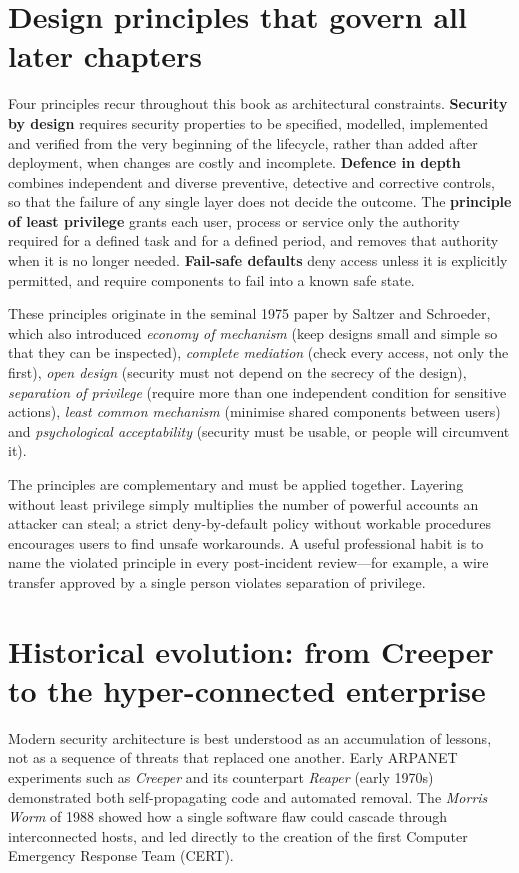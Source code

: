 \section{Design principles that govern all later chapters}\label{sec:1.3}
Four principles recur throughout this book as architectural constraints. \textbf{Security by design} requires security properties to be specified, modelled, implemented and verified from the very beginning of the lifecycle, rather than added after deployment, when changes are costly and incomplete. \textbf{Defence in depth} combines independent and diverse preventive, detective and corrective controls, so that the failure of any single layer does not decide the outcome. The \textbf{principle of least privilege} grants each user, process or service only the authority required for a defined task and for a defined period, and removes that authority when it is no longer needed. \textbf{Fail-safe defaults} deny access unless it is explicitly permitted, and require components to fail into a known safe state.

These principles originate in the seminal 1975 paper by Saltzer and Schroeder, which also introduced \emph{economy of mechanism} (keep designs small and simple so that they can be inspected), \emph{complete mediation} (check every access, not only the first), \emph{open design} (security must not depend on the secrecy of the design), \emph{separation of privilege} (require more than one independent condition for sensitive actions), \emph{least common mechanism} (minimise shared components between users) and \emph{psychological acceptability} (security must be usable, or people will circumvent it).

The principles are complementary and must be applied together. Layering without least privilege simply multiplies the number of powerful accounts an attacker can steal; a strict deny-by-default policy without workable procedures encourages users to find unsafe workarounds. A useful professional habit is to name the violated principle in every post-incident review—for example, a wire transfer approved by a single person violates separation of privilege.

\section{Historical evolution: from Creeper to the hyper-connected enterprise}\label{sec:1.4}
Modern security architecture is best understood as an accumulation of lessons, not as a sequence of threats that replaced one another. Early ARPANET experiments such as \emph{Creeper} and its counterpart \emph{Reaper} (early 1970s) demonstrated both self-propagating code and automated removal. The \emph{Morris Worm} of 1988 showed how a single software flaw could cascade through interconnected hosts, and led directly to the creation of the first Computer Emergency Response Team (CERT).

